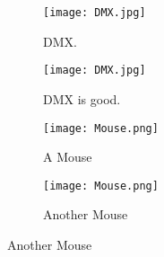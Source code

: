 \documentclass{article}
\begin{document}
	\begin{figure}[h!]
		\centering
		\begin{subfigure}[b]{0.2\linewidth}
		
		\texttt{[image: DMX.jpg]}
		\caption{DMX.} \end{subfigure}
		\begin{subfigure}[b]{0.2\linewidth}
			
			\texttt{[image: DMX.jpg]}
			\caption{DMX is good.} \end{subfigure}
			\begin{subfigure}[b]{0.2\linewidth}
				
				\texttt{[image: Mouse.png]}
				\caption{A Mouse} \end{subfigure}
				\begin{subfigure}[b]{0.2\linewidth}
					
					\texttt{[image: Mouse.png]}
					\caption{Another Mouse} \end{subfigure}
	\end{figure}
\end{document}
